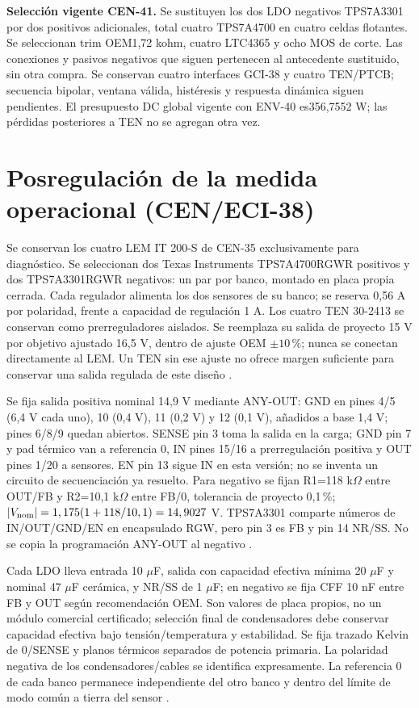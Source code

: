 \textbf{Selección vigente CEN-41.} Se sustituyen los dos LDO negativos TPS7A3301 por dos positivos adicionales, total cuatro TPS7A4700 en cuatro celdas flotantes. Se seleccionan trim OEM1,72 kohm, cuatro LTC4365 y ocho MOS de corte. Las conexiones y pasivos negativos que siguen pertenecen al antecedente sustituido, sin otra compra. Se conservan cuatro interfaces GCI-38 y cuatro TEN/PTCB; secuencia bipolar, ventana válida, histéresis y respuesta dinámica siguen pendientes. El presupuesto DC global vigente con ENV-40 es356,7552 W; las pérdidas posteriores a TEN no se agregan otra vez.

\section{Posregulación de la medida operacional (CEN/ECI-38)}
\label{sec:sd4-posregulacion-cen38}
Se conservan los cuatro LEM IT 200-S de CEN-35 exclusivamente para diagnóstico. Se seleccionan dos Texas Instruments TPS7A4700RGWR positivos y dos TPS7A3301RGWR negativos: un par por banco, montado en placa propia cerrada. Cada regulador alimenta los dos sensores de su banco; se reserva 0,56 A por polaridad, frente a capacidad de regulación 1 A. Los cuatro TEN 30-2413 se conservan como prerreguladores aislados. Se reemplaza su salida de proyecto 15 V por objetivo ajustado 16,5 V, dentro de ajuste OEM $\pm10\,\%$; nunca se conectan directamente al LEM. Un TEN sin ese ajuste no ofrece margen suficiente para conservar una salida regulada de este diseño \parencites[pp.~1 y 3]{lote35-ten30}[pp.~3--6]{lote38-positive}[pp.~4--6]{lote38-negative}.

Se fija salida positiva nominal 14,9 V mediante ANY-OUT: GND en pines 4/5 (6,4 V cada uno), 10 (0,4 V), 11 (0,2 V) y 12 (0,1 V), añadidos a base 1,4 V; pines 6/8/9 quedan abiertos. SENSE pin 3 toma la salida en la carga; GND pin 7 y pad térmico van a referencia 0, IN pines 15/16 a prerregulación positiva y OUT pines 1/20 a sensores. EN pin 13 sigue IN en esta versión; no se inventa un circuito de secuenciación ya resuelto. Para negativo se fijan R1=118 k$\Omega$ entre OUT/FB y R2=10,1 k$\Omega$ entre FB/0, tolerancia de proyecto 0,1\,\%; $|V_{\rm nom}|=1,175(1+118/10,1)=14,9027$ V. TPS7A3301 comparte números de IN/OUT/GND/EN en encapsulado RGW, pero pin 3 es FB y pin 14 NR/SS. No se copia la programación ANY-OUT al negativo \parencites[pp.~3--4 y 14--16]{lote38-positive}[pp.~4 y 16--17]{lote38-negative}.

Cada LDO lleva entrada 10 $\mu$F, salida con capacidad efectiva mínima 20 $\mu$F y nominal 47 $\mu$F cerámica, y NR/SS de 1 $\mu$F; en negativo se fija CFF 10 nF entre FB y OUT según recomendación OEM. Son valores de placa propios, no un módulo comercial certificado; selección final de condensadores debe conservar capacidad efectiva bajo tensión/temperatura y estabilidad. Se fija trazado Kelvin de 0/SENSE y planos térmicos separados de potencia primaria. La polaridad negativa de los condensadores/cables se identifica expresamente. La referencia 0 de cada banco permanece independiente del otro banco y dentro del límite de modo común a tierra del sensor \parencites[pp.~3--4 y 14--18]{lote38-positive}[pp.~4 y 16--18]{lote38-negative}.

